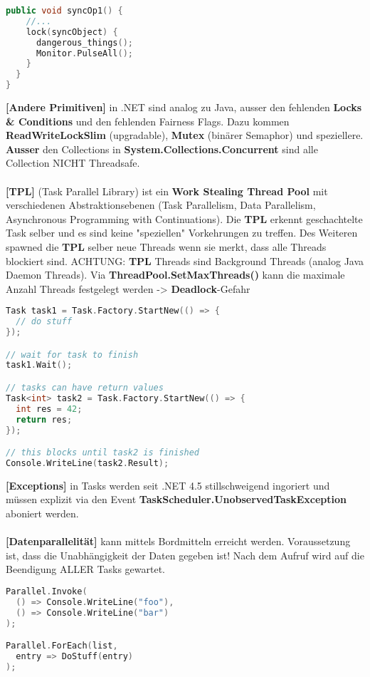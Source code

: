 \documentclass[8pt]{extarticle}
\let\oldtextbf\textbf
\renewcommand{\textbf}{\tiny\oldtextbf}
\begin{document}
\begin{multicols*}{5}
\begin{lstlisting}[language=c++]
  public void syncOp1() {
    //...
    lock(syncObject) {
      dangerous_things();
      Monitor.PulseAll();
    }
  }
}
\end{lstlisting}
\textbf{[Andere Primitiven]} in .NET sind analog zu Java, ausser den fehlenden \textbf{Locks \& Conditions} und den  fehlenden Fairness Flags. Dazu kommen \textbf{ReadWriteLockSlim} (upgradable), \textbf{Mutex} (binärer Semaphor) und speziellere. \textbf{Ausser} den Collections in \textbf{System.Collections.Concurrent} sind alle Collection NICHT Threadsafe.\\\\
\textbf{[TPL]} (Task Parallel Library) ist ein \textbf{Work Stealing Thread Pool} mit verschiedenen Abstraktionsebenen (Task Parallelism, Data Parallelism, Asynchronous Programming with Continuations). Die \textbf{TPL} erkennt geschachtelte Task selber und es sind keine "speziellen" Vorkehrungen zu treffen. Des Weiteren spawned die \textbf{TPL} selber neue Threads wenn sie merkt, dass alle Threads blockiert sind. ACHTUNG: \textbf{TPL} Threads sind Background Threads (analog Java Daemon Threads). Via \textbf{ThreadPool.SetMaxThreads()} kann die maximale Anzahl Threads festgelegt werden -> \textbf{Deadlock}-Gefahr
\begin{lstlisting}[language=c++]
Task task1 = Task.Factory.StartNew(() => {
  // do stuff
});

// wait for task to finish
task1.Wait();

// tasks can have return values
Task<int> task2 = Task.Factory.StartNew(() => {
  int res = 42;
  return res;
});

// this blocks until task2 is finished
Console.WriteLine(task2.Result);
\end{lstlisting}
\textbf{[Exceptions]} in Tasks werden seit .NET 4.5 stillschweigend ingoriert und müssen explizit via den Event \textbf{TaskScheduler.UnobservedTaskException} aboniert werden.\\\\
\textbf{[Datenparallelität]} kann mittels Bordmitteln erreicht werden. Voraussetzung ist, dass die Unabhängigkeit der Daten gegeben ist! Nach dem Aufruf wird auf die Beendigung ALLER Tasks gewartet.
\begin{lstlisting}[language=c++]
Parallel.Invoke(
  () => Console.WriteLine("foo"),
  () => Console.WriteLine("bar")
);

Parallel.ForEach(list,
  entry => DoStuff(entry)
);


\end{lstlisting}
\end{multicols*}
\end{document}
